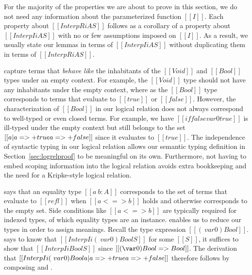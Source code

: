 \documentclass[acmsmall,screen=true,
\ifpublic review=false\else,review=true\fi
  ,anonymous=\ifanonymous true\else false\fi]{acmart}
\newcommand{\yl}[1]{}
\begin{document}
For the majority of the properties we are about to prove in this section, we
do not need any information about the parameterized function $[[I]]$.
Each property about $[[InterpR i A S]]$ follows as a corollary of
a property about $[[Interp I i A S]]$ with no or few assumptions imposed on
$[[I]]$. As a result, we usually state our lemmas in terms of
$[[Interp I i A S]]$ without duplicating them in terms of $[[InterpR i
A S]]$.

 capture terms that \emph{behave like} the inhabitants
of the $[[Void]]$ and $[[Bool]]$ types under an empty context. For
example, the $[[Void]]$ type should not have any inhabitants under the
empty context, where as the $[[Bool]]$ type corresponds to terms that
evaluate to $[[true]]$ or $[[false]]$. However, the characterization
of $[[Bool]]$ in our logical relation does not always correspond to
well-typed or even closed terms. For example, we have $[[if false var 0
true]]$ is ill-typed under the empty context but still belongs to the set $[[{ a | a =>+
  true \/ a =>+ false }]]$ since it evaluates to $[[true]]$.
The independence of syntactic typing in our logical relation allows
our semantic typing definition in Section~\ref{sec:logrelproof} to be
meaningful on its own. Furthermore, not having to embed scoping
information into the logical relation avoids extra bookkeeping and the
need for a Kripke-style logical relation.
\yl{Not sure what to cite from Derek Dreyer. I know his blog post
  about semantic type soundness but is there a good paper to cite? one
of the rust papers?}

says that an equality type $[[a ~ b : A]]$ corresponds to the
set of terms that evaluate to $[[refl]]$ when $[[a <=> b]]$ holds and
otherwise corresponds to the empty set. Side conditions like $[[a <=>
b]]$ are typically required for indexed types, of which equality types
are an instance.  enables us to reduce our types in order
to assign meanings. Recall the type expression $[[(\ var 0)
Bool]]$.  says to know that
$[[Interp I i  (\ var 0) Bool S ]]$ for some $[[S]]$, it suffices to
show that $[[Interp I i Bool S]]$ since $[[(\var 0) Bool =>
Bool]]$. The derivation that $[[Interp I i (\ var 0) Bool { a | a =>+
  true \/ a =>+ false }]]$ therefore follows by composing 
and .
\end{document}
